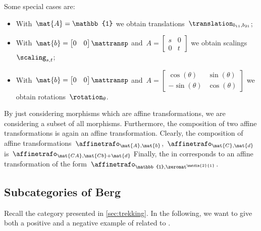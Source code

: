 {\begin{solution}
\begin{itemize}
              Some special cases are:
              \begin{itemize}
                  \item With~$\mat{A}=\mathbb{1}$ we obtain translations~$\translation_{b_{11},b_{21}}$;
                  \item With~$\mat{b}=\begin{bmatrix}
                                0 & 0
                            \end{bmatrix}\mattransp$ and~$A=\begin{bmatrix}
                                s & 0 \\0& t
                            \end{bmatrix}$ we obtain scalings~$\scaling_{s,t}$;
                  \item With~$\mat{b}=\begin{bmatrix}
                                0 & 0
                            \end{bmatrix}\mattransp$ and~$A=\begin{bmatrix}
                                \cos(\theta) & \sin(\theta) \\-\sin(\theta)& \cos(\theta)
                            \end{bmatrix}$ we obtain rotations~$\rotation_{\theta}$.
              \end{itemize}
              By just considering morphisms which are affine transformations, we are considering a subset of all morphisms.
              Furthermore, the composition of two affine transformations is again an affine transformation.
              Clearly, the composition of affine transformations~$\affinetrafo_{\mat{A},\mat{b}}$,~$\affinetrafo_{\mat{C},\mat{d}}$ is~$\affinetrafo_{\mat{CA},\mat{Cb}+\mat{d}}$
              Finally, the  in \Draw corresponds to an affine transformation of the form~$\affinetrafo_{\mathbb{1},\zeromat^{\matdim{2}{1}}}$.
    \end{itemize}
\end{solution}


\subsection{Subcategories of Berg}
\label{sec:subcat_berg}

Recall the category \Berg presented in \cref{sec:trekking}.
In the following, we want to give both a positive and a negative example of  related to \Berg.

}
